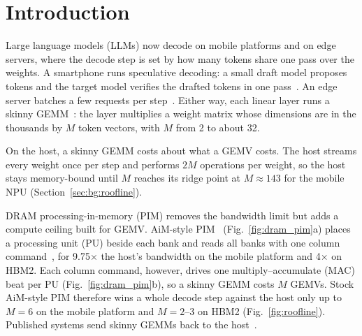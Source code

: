 \section{Introduction}
\label{sec:intro}

Large language models (LLMs) now decode on mobile platforms and on edge servers, where the decode step is set by how many tokens share one pass over the weights. A smartphone runs speculative decoding: a small draft model proposes tokens and the target model verifies the drafted tokens in one pass~\cite{leviathan2023,sdnpu,lpspec}. An edge server batches a few requests per
step~\cite{newton,h2llm,p3llm}. Either way, each linear layer runs a skinny GEMM~\cite{flashdecodingpp}: the layer multiplies a weight matrix whose
dimensions are in the thousands by $M$ token vectors, with $M$ from 2 to about 32.

On the host, a skinny GEMM costs about what a GEMV costs. The host streams every weight once per step and performs $2M$
operations per weight, so the host stays memory-bound until $M$ reaches its ridge point at $M \approx 143$ for the mobile NPU (Section~\ref{sec:bg:roofline}).

DRAM processing-in-memory (PIM) removes the bandwidth limit but adds a compute ceiling built for GEMV. AiM-style PIM~\cite{aimisscc,aimjssc,aimhc34} (Fig.~\ref{fig:dram_pim}a)
places a processing unit (PU) beside each bank and reads all banks with one column command~\cite{hbmpim}, for 9.75$\times$ the host's bandwidth on the mobile platform and 4$\times$ on HBM2. Each column command, however, drives one
multiply--accumulate (MAC) beat per PU (Fig.~\ref{fig:dram_pim}b), so a skinny GEMM costs $M$ GEMVs. Stock AiM-style PIM therefore wins a whole
decode step against the host only up to $M = 6$ on the mobile platform and $M = 2$--3 on HBM2 (Fig.~\ref{fig:roofline}).
Published systems send skinny GEMMs back to the host~\cite{attacc,neupims,ianus,p3llm}.

